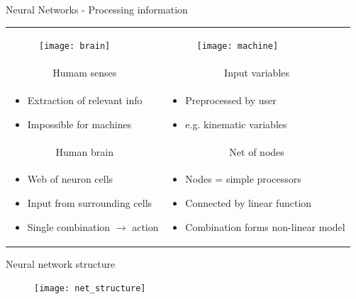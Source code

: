 \begin{frame}{Neural Networks - Processing information}
\begin{tabular}{p{5cm}|p{5cm}}
    \begin{figure}
    	\texttt{[image: brain]}
    \end{figure}
    & 
    \begin{figure}
    	\texttt{[image: machine]}
    \end{figure} \\
  \multicolumn{1}{c|}{Humam senses} & \multicolumn{1}{c}{Input variables} \\
    \begin{itemize}
        \item Extraction of relevant info
        \item Impossible for machines
    \end{itemize}
    & 
    \begin{itemize}
      \item Preprocessed by user
      \item {e.g.} kinematic variables
    \end{itemize} \\
\multicolumn{1}{c|}{Human brain} & \multicolumn{1}{c}{Net of nodes} \\
    \begin{itemize}
        \item Web of neuron cells
        \item Input from surrounding cells
        \item Single combination $\rightarrow$ action
    \end{itemize}
    & 
    \begin{itemize}
      \item Nodes = simple processors
      \item Connected by linear function
      \item Combination forms non-linear model
    \end{itemize} 
 \end{tabular}
\end{frame}


\begin{frame}{Neural network structure}
\begin{figure}
\centering
\texttt{[image: net\_structure]}
\end{figure}
\end{frame}

